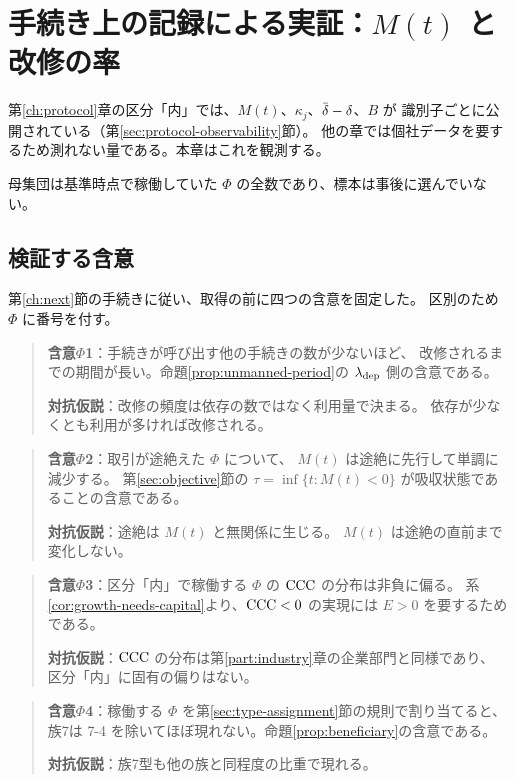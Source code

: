 \chapter{手続き上の記録による実証：\texorpdfstring{$M(t)$}{M(t)} と改修の率}
\label{ch:protocol-emp}

第\ref{ch:protocol}章の区分「内」では、$M(t)$、$\kappa_j$、$\dbar-\delta$、$B$ が
識別子ごとに公開されている（第\ref{sec:protocol-observability}節）。
他の章では個社データを要するため測れない量である。本章はこれを観測する。

母集団は基準時点で稼働していた $\Phi$ の全数であり、標本は事後に選んでいない。

\section{検証する含意}
\label{sec:protocol-predictions}

第\ref{ch:next}節の手続きに従い、取得の前に四つの含意を固定した。
区別のため $\Phi$ に番号を付す。

\begin{quote}
\textbf{含意$\Phi$1}：手続きが呼び出す他の手続きの数が少ないほど、
改修されるまでの期間が長い。命題\ref{prop:unmanned-period}の $\lambda_{\rm dep}$ 側の含意である。

\textbf{対抗仮説}：改修の頻度は依存の数ではなく利用量で決まる。
依存が少なくとも利用が多ければ改修される。
\end{quote}

\begin{quote}
\textbf{含意$\Phi$2}：取引が途絶えた $\Phi$ について、
$M(t)$ は途絶に先行して単調に減少する。
第\ref{sec:objective}節の $\tau=\inf\{t:M(t)<0\}$ が吸収状態であることの含意である。

\textbf{対抗仮説}：途絶は $M(t)$ と無関係に生じる。
$M(t)$ は途絶の直前まで変化しない。
\end{quote}

\begin{quote}
\textbf{含意$\Phi$3}：区分「内」で稼働する $\Phi$ の $\mathrm{CCC}$ の分布は非負に偏る。
系\ref{cor:growth-needs-capital}より、$\mathrm{CCC}<0$ の実現には $E>0$ を要するためである。

\textbf{対抗仮説}：$\mathrm{CCC}$ の分布は第\ref{part:industry}章の企業部門と同様であり、
区分「内」に固有の偏りはない。
\end{quote}

\begin{quote}
\textbf{含意$\Phi$4}：稼働する $\Phi$ を第\ref{sec:type-assignment}節の規則で割り当てると、
族7は 7-4 を除いてほぼ現れない。命題\ref{prop:beneficiary}の含意である。

\textbf{対抗仮説}：族7型も他の族と同程度の比重で現れる。
\end{quote}

